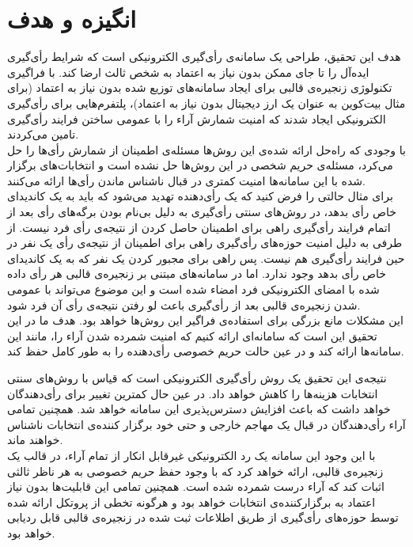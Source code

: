 \section{انگیزه و هدف}
هدف این تحقیق، طراحی یک سامانه‌ی رأی‌گیری الکترونیکی است که شرایط رأی‌گیری ایده‌آل را تا جای ممکن بدون نیاز به اعتماد به شخص ثالث ارضا کند. با فراگیری تکنولوژی زنجیره‌ی قالبی برای ایجاد سامانه‌های توزیع شده بدون نیاز به اعتماد (برای مثال بیت‌کوین به عنوان یک‌ ارز دیجیتال بدون نیاز به اعتماد)، پلتفرم‌هایی برای رأی‌گیری الکترونیکی ایجاد شدند که امنیت شمارش آراء را با عمومی ساختن فرایند رأی‌گیری تامین می‌کردند. 
\\
با وجودی که راه‌حل ارائه شده‌ی این روش‌ها مسئله‌ی اطمینان از شمارش رأی‌ها را حل می‌کرد، مسئله‌ی حریم شخصی در این روش‌ها حل نشده است و انتخابات‌های برگزار شده با این سامانه‌ها امنیت کمتری در قبال ناشناس ماندن رأی‌ها ارائه می‌کنند. 
\\
برای مثال حالتی را فرض کنید که یک رأی‌دهنده تهدید می‌شود که باید به یک کاندیدای خاص رأی بدهد، در روش‌های سنتی رأی‌گیری به دلیل بی‌نام بودن برگه‌های رأی بعد از اتمام فرایند رأی‌گیری راهی برای اطمینان حاصل کردن از نتیجه‌ی رأی فرد نیست. از طرفی به دلیل امنیت حوزه‌های رأی‌گیری راهی برای اطمینان از نتیجه‌ی رأی یک نفر در حین فرایند رأی‌گیری هم نیست. پس راهی برای مجبور کردن یک نفر که به یک کاندیدای خاص رأی بدهد وجود ندارد. اما در سامانه‌های مبتنی بر زنجیره‌ی قالبی هر رأی داده شده با امضای الکترونیکی فرد امضاء شده است و این موضوع می‌تواند با عمومی شدن زنجیره‌ی قالبی بعد از رأی‌گیری باعث لو رفتن نتیجه‌ی رأی آن فرد شود.
\\
این مشکلات مانع بزرگی برای استفاده‌ی فراگیر این روش‌ها خواهد بود. هدف ما در این تحقیق این است که سامانه‌ای ارائه کنیم که امنیت شمرده شدن آراء را، مانند این سامانه‌ها ارائه کند و در عین حالت حریم خصوصی رأی‌دهنده را به طور کامل حفظ کند. 
\par
نتیجه‌ی این تحقیق یک روش‌ رأی‌گیری الکترونیکی است که قیاس با روش‌های سنتی انتخابات هزینه‌ها را کاهش خواهد داد. در عین حال کمترین تغییر برای رأی‌دهندگان خواهد داشت که باعث افزایش دسترس‌پذیری این سامانه خواهد شد. همچنین تمامی آراء رأی‌دهندگان در قبال یک مهاجم خارجی و حتی خود برگزار کننده‌ی انتخابات ناشناس خواهند ماند. 
\\
با این وجود این سامانه یک رد الکترونیکی غیرقابل انکار از تمام آراء، در قالب یک زنجیره‌ی قالبی، ارائه ‌خواهد کرد که با وجود حفظ حریم خصوصی به هر ناظر ثالثی اثبات کند که آراء درست شمرده شده است. همچنین تمامی این قابلیت‌ها بدون نیاز اعتماد به برگزارکننده‌ی انتخابات خواهد بود و هرگونه تخطی از پروتکل ارائه شده توسط حوزه‌های رأی‌گیری از طریق اطلاعات ثبت شده در زنجیره‌ی قالبی قابل ردیابی خواهد بود.








